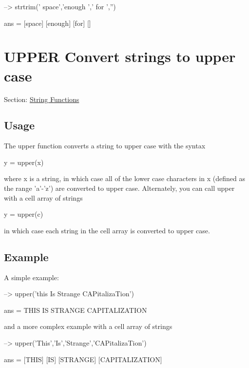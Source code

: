 \begin{DoxyVerbInclude}
--> strtrim({'  space','enough ',' for ',''})

ans = 
 [space] [enough] [for] [] 
\end{DoxyVerbInclude}
 \hypertarget{string_upper}{}\section{U\-P\-P\-E\-R Convert strings to upper case}\label{string_upper}
Section\-: \hyperlink{sec_string}{String Functions} \hypertarget{vtkwidgets_vtkxyplotwidget_Usage}{}\subsection{Usage}\label{vtkwidgets_vtkxyplotwidget_Usage}
The {\ttfamily upper} function converts a string to upper case with the syntax \begin{DoxyVerb}   y = upper(x)
\end{DoxyVerb}
 where {\ttfamily x} is a string, in which case all of the lower case characters in {\ttfamily x} (defined as the range {\ttfamily 'a'-\/'z'}) are converted to upper case. Alternately, you can call {\ttfamily upper} with a cell array of strings \begin{DoxyVerb}   y = upper(c)
\end{DoxyVerb}
 in which case each string in the cell array is converted to upper case. \hypertarget{variables_struct_Example}{}\subsection{Example}\label{variables_struct_Example}
A simple example\-:


\begin{DoxyVerbInclude}
--> upper('this Is Strange CAPitalizaTion')

ans = 
THIS IS STRANGE CAPITALIZATION
\end{DoxyVerbInclude}


and a more complex example with a cell array of strings


\begin{DoxyVerbInclude}
--> upper({'This','Is','Strange','CAPitalizaTion'})

ans = 
 [THIS] [IS] [STRANGE] [CAPITALIZATION] 
\end{DoxyVerbInclude}
 